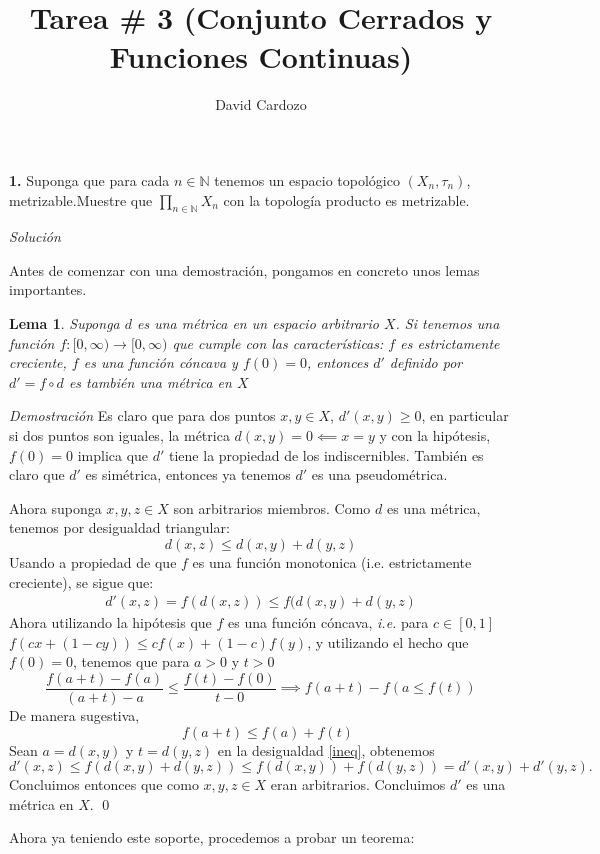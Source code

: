\documentclass[]{article}
\author{David Cardozo}
\title{Tarea \# 3 (Conjunto Cerrados y Funciones Continuas)}
\newtheorem{lem}{Lema}
\begin{document}
\maketitle

\textbf{1. } Suponga que para cada $ n \in \mathbb{N} $ tenemos un espacio topológico $ (X_n, \tau_n) $, metrizable.Muestre que $ \prod_{n \in \mathbb{N}}^{}X_n $ con la topología producto es metrizable.

\textit{Solución}

Antes de comenzar con una demostración, pongamos en concreto unos lemas importantes.

\begin{lem}
	Suponga $ d $ es una métrica en un espacio arbitrario $ X $. Si tenemos una función $ f:[0,\infty) \rightarrow [0, \infty) $  que cumple con las características: $ f $ es estrictamente creciente, $f$ es una función cóncava y $ f(0) = 0 $, entonces $d'$ definido por $ d'= f \circ d $ es también una métrica en $X$ 
\end{lem}

\textit{Demostración} Es claro que para dos puntos $x,y \in X$, $ d'(x,y) \geq 0 $, en particular si dos puntos son iguales, la métrica $ d(x,y) = 0 \impliedby x=y $ y con la hipótesis, $ f(0)=0 $ implica que $ d' $ tiene la propiedad de los indiscernibles. También es claro que $d'$ es simétrica, entonces ya tenemos $ d' $ es una pseudométrica.

Ahora suponga $ x,y,z \in X $ son arbitrarios miembros. Como $ d $ es una métrica, tenemos por desigualdad triangular:
\[ d(x,z) \leq d(x,y) + d(y,z) \]
Usando a propiedad de que $f$ es una función monotonica (i.e. estrictamente creciente), se sigue que:
\begin{align}\label{ineq}
d'(x,z) = f(d(x,z)) \leq f(d(x,y) + d(y,z)  
\end{align} 
Ahora utilizando la hipótesis que $f$ es una función cóncava, \emph{i.e.} para $ c \in [0,1] $ $f (cx + (1-cy)) \leq cf(x) + (1-c)f(y)$, y utilizando el hecho que $ f(0) = 0 $, tenemos que para $ a >0 $ y $ t>0 $
\[ \frac{f(a+t) - f(a)}{(a+t)-a} \leq \frac{f(t) - f(0)}{t - 0} \implies f(a+t) - f(a \leq f(t))  \]
De manera sugestiva,
\[  \quad f(a+t) \leq f(a) + f(t) \]
Sean $ a = d(x,y) $ y $ t = d(y,z) $ en la desigualdad \eqref{ineq}, obtenemos
\[ d'(x,z) \leq f(d(x,y) + d(y,z)) \leq f(d(x,y)) + f(d(y,z)) = d'(x,y) + d'(y,z). \]
Concluimos entonces que como $ x,y,z \in X $ eran arbitrarios. Concluimos $ d' $ es una métrica en $X$. \qed

Ahora ya teniendo este soporte, procedemos a probar un teorema:
\end{document}
